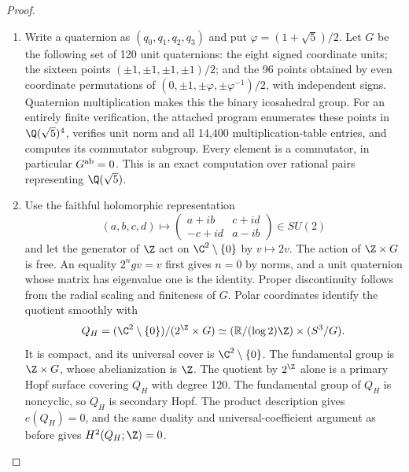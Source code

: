 \begin{proof}

\begin{enumerate}[label={$\langle1\rangle$\arabic*.},leftmargin=*]
\item Write a quaternion as $(q_0,q_1,q_2,q_3)$ and put
$\varphi=(1+\sqrt5)/2$. Let $G$ be the following set of 120 unit
quaternions: the eight signed coordinate units; the sixteen points
$(\pm1,\pm1,\pm1,\pm1)/2$; and the 96 points obtained by even
coordinate permutations of
$(0,\pm1,\pm\varphi,\pm\varphi^{-1})/2$, with independent signs.
Quaternion multiplication makes this the binary icosahedral group.
For an entirely finite verification, the attached program enumerates
these points in $\Q(\sqrt5)^4$, verifies unit norm and all 14,400
multiplication-table entries, and computes its commutator subgroup.
Every element is a commutator, in particular $G^{\rm ab}=0$.
This is an exact computation over rational pairs representing
$\Q(\sqrt5)$.

\item Use the faithful holomorphic representation
\[
(a,b,c,d)\longmapsto
\begin{pmatrix}a+ib&c+id\\-c+id&a-ib\end{pmatrix}\in SU(2)
\]
and let the generator of $\Z$ act on $\C^2\setminus\{0\}$ by
$v\mapsto2v$. The action of $\Z\times G$ is free. An equality
$2^ngv=v$ first gives $n=0$ by norms, and a unit quaternion whose
matrix has eigenvalue one is the identity. Proper discontinuity
follows from the radial scaling and finiteness of $G$.
Polar coordinates identify the quotient smoothly with
\[
Q_H=(\C^2\setminus\{0\})/(2^{\Z}\times G)
\simeq (\mathbb R/(\log2)\Z)\times(S^3/G).
\]
It is compact, and its universal cover is $\C^2\setminus\{0\}$.
The fundamental group is $\Z\times G$, whose abelianization is
$\Z$. The quotient by $2^{\Z}$ alone is a primary Hopf surface
covering $Q_H$ with degree 120. The fundamental group of $Q_H$ is
noncyclic, so $Q_H$ is secondary Hopf. The product description gives
$e(Q_H)=0$, and the same duality and universal-coefficient argument
as before gives $H^2(Q_H;\Z)=0$.

\end{enumerate}
\end{proof}
